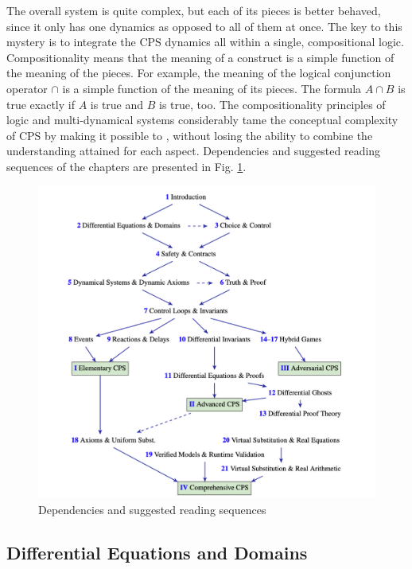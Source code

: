 The overall system is quite complex, but each of its pieces is better behaved, since it only has one dynamics as opposed to all of them at once.
The key to this mystery is to integrate the CPS dynamics all within a single, compositional logic.
Compositionality means that the meaning of a construct is a simple function of the meaning of the pieces.
For example, the meaning of the logical conjunction operator $\cap$ is a simple function of the meaning of its pieces.
The formula $A \cap B$ is true exactly if $A$ is true and $B$ is true, too.
The compositionality principles of logic and multi-dynamical systems considerably tame the conceptual complexity of CPS by making it possible to , without losing the ability to combine the understanding attained for each aspect.
Dependencies and suggested reading sequences of the chapters are presented in Fig. \ref{fig:socps}.

\begin{figure}
  \centering
  \includegraphics[width=.8\linewidth]{notes/hybrid-dynamical-system/figures/structure-of-cps.png}
  \caption{Dependencies and suggested reading sequences}
  \label{fig:socps}
\end{figure}

\subsection{Differential Equations and Domains}


